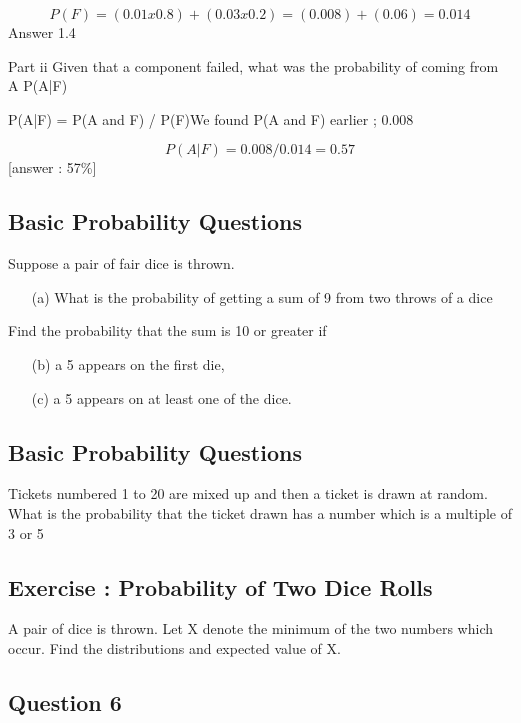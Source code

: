 \documentclass[]{report}
\begin{document}
\[P(F)  =  ( 0.01 x 0.8 ) + ( 0.03 x 0.2) = (0.008) + (0.06) = 0.014\]
Answer 1.4%

Part ii
Given that a component failed, what was the probability of coming from A
P(A|F) 

P(A|F) = P(A and F)  / P(F)We found P(A and F) earlier ; 0.008

\[P(A|F) = 0.008/0.014 =  0.57\][answer : 57\%]

\subsection{Basic Probability Questions}

Suppose a pair of fair dice is thrown. 
\begin{itemize}
\item[(a)] What is the probability of getting a sum of 9 from two throws of a dice
\end{itemize}
Find the probability that the sum is 10 or greater if
\begin{itemize}
\item[(b)] a 5 appears on the first die, 
\item[(c)] a 5 appears on at least one of the dice.
\end{itemize}

\subsection{Basic Probability Questions}
Tickets numbered 1 to 20 are mixed up and then a ticket is drawn at random. What is the probability that the ticket drawn has a number which is a multiple of 3 or 5



\subsection{Exercise : Probability of Two Dice Rolls}
A pair of dice is thrown. Let X denote the minimum of the two numbers which occur.
Find the distributions and expected value of X.

\newpage
\subsection{Question 6}
\end{document}
